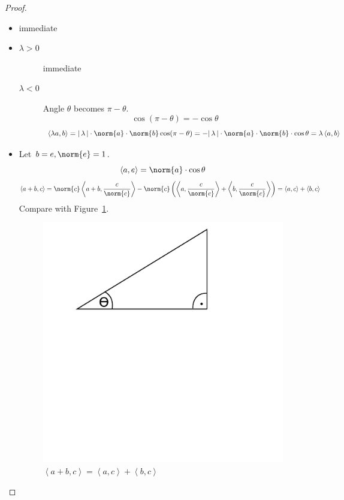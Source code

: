 \documentclass[a4paper,landscape,twocolumn]{article}
\newcommand\abs[1]{|\,#1\,|}
\newcommand\functional[1]{\left\langle{#1}\right\rangle}
\theoremstyle{definition}
\DeclarePairedDelimiter\norm\lVert\rVert
\begin{document}
\begin{proof}
  \begin{itemize}
    \item immediate
    \item
      \begin{description}
        \item[$\lambda > 0$]
          immediate
        \item[$\lambda < 0$]
          Angle $\theta$ becomes $\pi - \theta$.
          \[ \cos(\pi - \theta) = -\cos{\theta} \]
          \[ \functional{\lambda a,b} = \abs{\lambda} \cdot \norm{a} \cdot \norm{b} \cos(\pi - \theta) = -\abs{\lambda} \cdot \norm{a} \cdot \norm{b} \cdot \cos{\theta} = \lambda \functional{a,b} \]
      \end{description}
    \item
      Let $b = e, \norm{e} = 1$.
      \[ \functional{a,e} = \norm{a} \cdot \cos{\theta} \]
      \[ \functional{a+b,c} = \norm{c} \functional{a+b,\frac{c}{\norm{c}}} - \norm{c} \left(\functional{a,\frac{c}{\norm{c}}} + \functional{b,\frac{c}{\norm{c}}}\right) = \functional{a,c} + \functional{b,c} \]
      Compare with Figure~\ref{img:383}.
      \begin{figure}[!h]
        \begin{center}
          \includegraphics{img/8_3_3.pdf}
          \caption{$\functional{a+b,c} = \functional{a,c} + \functional{b,c}$}
          \label{img:383}
        \end{center}
      \end{figure}
  \end{itemize}
\end{proof}
\end{document}
